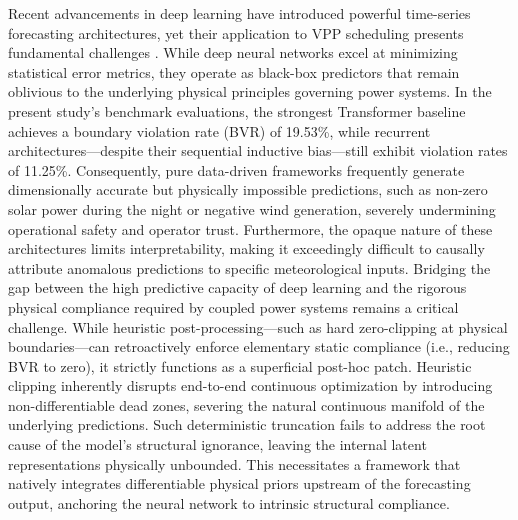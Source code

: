 Recent advancements in deep learning have introduced powerful time-series forecasting architectures, yet their application to VPP scheduling presents fundamental challenges \cite{Vle2025,Arabzadeh2025}. While deep neural networks excel at minimizing statistical error metrics, they operate as black-box predictors that remain oblivious to the underlying physical principles governing power systems. In the present study's benchmark evaluations, the strongest Transformer baseline achieves a boundary violation rate (BVR) of 19.53\%, while recurrent architectures---despite their sequential inductive bias---still exhibit violation rates of 11.25\%. Consequently, pure data-driven frameworks frequently generate dimensionally accurate but physically impossible predictions, such as non-zero solar power during the night or negative wind generation, severely undermining operational safety and operator trust. Furthermore, the opaque nature of these architectures limits interpretability, making it exceedingly difficult to causally attribute anomalous predictions to specific meteorological inputs. Bridging the gap between the high predictive capacity of deep learning and the rigorous physical compliance required by coupled power systems remains a critical challenge. While heuristic post-processing---such as hard zero-clipping at physical boundaries---can retroactively enforce elementary static compliance (i.e., reducing BVR to zero), it strictly functions as a superficial post-hoc patch. Heuristic clipping inherently disrupts end-to-end continuous optimization by introducing non-differentiable dead zones, severing the natural continuous manifold of the underlying predictions. Such deterministic truncation fails to address the root cause of the model's structural ignorance, leaving the internal latent representations physically unbounded. This necessitates a framework that natively integrates differentiable physical priors upstream of the forecasting output, anchoring the neural network to intrinsic structural compliance.

